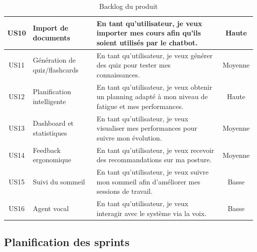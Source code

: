 {\begin{table}[H]
\begin{tabularx}{\textwidth}{|c|p{3cm}|X|c|}
US10 & Import de documents
& En tant qu’utilisateur, je veux importer mes cours afin qu’ils soient utilisés par le chatbot.
& Haute \\ \hline

US11 & Génération de quiz/flashcards
& En tant qu’utilisateur, je veux générer des quiz pour tester mes connaissances.
& Moyenne \\ \hline

US12 & Planification intelligente
& En tant qu’utilisateur, je veux obtenir un planning adapté à mon niveau de fatigue et mes performances.
& Haute \\ \hline

US13 & Dashboard et statistiques
& En tant qu’utilisateur, je veux visualiser mes performances pour suivre mon évolution.
& Moyenne \\ \hline

US14 & Feedback ergonomique
& En tant qu’utilisateur, je veux recevoir des recommandations sur ma posture.
& Moyenne \\ \hline

US15 & Suivi du sommeil
& En tant qu’utilisateur, je veux suivre mon sommeil afin d’améliorer mes sessions de travail.
& Basse \\ \hline

US16 & Agent vocal
& En tant qu’utilisateur, je veux interagir avec le système via la voix.
& Basse \\ \hline

\end{tabularx}

\caption{Backlog du produit}
\label{tab:backlog}
\end{table}
}


\subsection{Planification des sprints}

